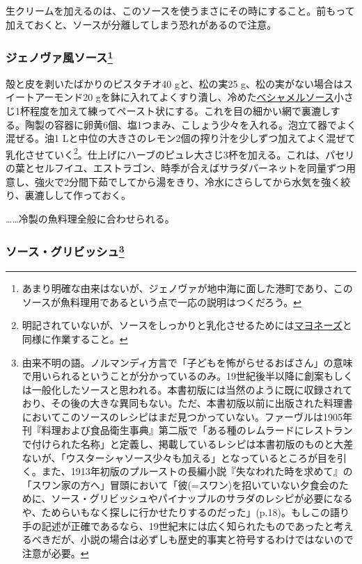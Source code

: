 \begin{recette}
生クリームを加えるのは、このソースを使うまさにその時にすること。前もって加えておくと、ソースが分離してしまう恐れがあるので注意。

\hypertarget{sauce-genoise-froids}{%
\subsubsection[ジェノヴァ風ソース]{\texorpdfstring{ジェノヴァ風ソース\footnote{あまり明確な由来はないが、ジェノヴァが地中海に面した港町であり、このソースが魚料理用であるという点で一応の説明はつくだろう。}}{ジェノヴァ風ソース}}\label{sauce-genoise-froids}}



殻と皮を剥いたばかりのピスタチオ40 gと、松の実25
g、松の実がない場合はスイートアーモンド20
gを鉢に入れてよくすり潰し、冷めた\protect\hyperlink{sauce-bechamel}{ベシャメルソース}小さじ1杯程度を加えて練ってペースト状にする。これを目の細かい網で裏漉しする。陶製の容器に卵黄6個、塩1つまみ、こしょう少々を入れる。泡立て器でよく混ぜる。油1
Lと中位の大きさのレモン2個の搾り汁を少しずつ加えてよく混ぜて乳化させていく\footnote{明記されていないが、ソースをしっかりと乳化させるためには\protect\hyperlink{mayonnaise}{マヨネーズ}と同様に作業すること。}。仕上げにハーブのピュレ大さじ3杯を加える。これは、パセリの葉とセルフイユ、エストラゴン、時季が合えばサラダバーネットを同量ずつ用意し、強火で2分間下茹でしてから湯をきり、冷水にさらしてから水気を強く絞り、裏漉しして作っておく。

\ldots{}\ldots{}冷製の魚料理全般に合わせられる。

\hypertarget{sauce-gribiche}{%
\subsubsection[ソース・グリビッシュ]{\texorpdfstring{ソース・グリビッシュ\footnote{由来不明の語。ノルマンディ方言で「子どもを怖がらせるおばさん」の意味で用いられるということが分かっているのみ。19世紀後半以降に創案もしくは一般化したソースと思われる。本書初版には当然のように既に収録されており、その後の大きな異同もない。ただ、本書初版以前に出版された料理書においてこのソースのレシピはまだ見つかっていない。ファーヴルは1905年刊『料理および食品衛生事典』第二版で「ある種のレムラードにレストランで付けられた名称」と定義し、掲載しているレシピは本書初版のものと大差ないが、「ウスターシャソース少々も加える」となっているところが目を引く。また、1913年初版のプルーストの長編小説『失なわれた時を求めて』の「スワン家の方へ」冒頭において「彼(=スワン)を招いていない夕食会のために、ソース・グリビッシュやパイナップルのサラダのレシピが必要になるや、ためらいもなく探しに行かせたりするのだった」(p.18)。もしこの語り手の記述が正確であるなら、19世紀末には広く知られたものであったと考えるべきだが、小説の場合は必ずしも歴史的事実と符号するわけではないので注意が必要。}}{ソース・グリビッシュ}}\label{sauce-gribiche}}


\end{recette}
